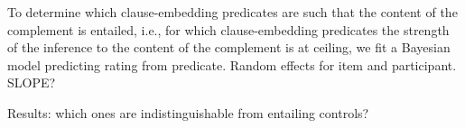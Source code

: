\documentclass[11pt,fleqn]{article}
\newcommand{\6}{\mbox{$[\hspace*{-.6mm}[$}}
\newcommand{\9}{\mbox{$]\hspace*{-.6mm}]$}}
\newcommand*\rot{\multicolumn{1}{R{90}{0em}}}%
\begin{document}
{To determine which clause-embedding predicates are such that the content of the complement is entailed, i.e., for which clause-embedding predicates the strength of the inference to the content of the complement is at ceiling, we fit a Bayesian model predicting rating from predicate. Random effects for item and participant. SLOPE? 

Results: which ones are indistinguishable from entailing controls?


%
%
%
}
\end{document}
